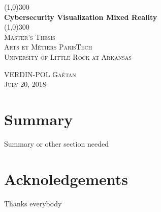 \documentclass[hidelinks]{article}
\begin{document}

\begin{titlepage}
	\begin{center}
            	\line(1,0){300} \\
        		[6mm]
	        	\huge{\bfseries Cybersecurity Visualization Mixed Reality} \\
        		[2mm]
	        	\line(1,0){300} \\
        		[1cm]
	        	\textsc {\LARGE Master's Thesis} \\
        		[0,5 cm]
	        	\textsc {\large Arts et Métiers ParisTech} \\
        		[0,5 cm]
	        	\textsc {\large University of Little Rock at Arkansas} \\
		[10cm]
	\end{center}
	
	\begin{flushright}
		\textsc {VERDIN-POL Gaétan \\
		July 20, 2018}
	\end{flushright}
\end{titlepage}




\section *{Summary}
Summary or other section needed
\cleardoublepage

\section *{Acknoledgements}
Thanks everybody
\cleardoublepage




\tableofcontents
\thispagestyle{empty}
\cleardoublepage
\end{document}
